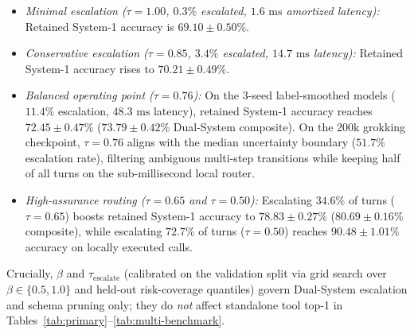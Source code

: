 \documentclass[10pt,twocolumn,letterpaper]{article}
\begin{document}
\begin{enumerate}[leftmargin=1.5em, itemsep=0.1em]
  \begin{itemize}[leftmargin=1.2em, itemsep=0.05em]
    \item \emph{Minimal escalation ($\tau = 1.00$, $0.3\%$ escalated, $1.6\text{ ms}$ amortized latency):} Retained System-1 accuracy is $69.10 \pm 0.50\%$.
    \item \emph{Conservative escalation ($\tau = 0.85$, $3.4\%$ escalated, $14.7\text{ ms}$ latency):} Retained System-1 accuracy rises to $70.21 \pm 0.49\%$.
    \item \emph{Balanced operating point ($\tau = 0.76$):} On the 3-seed label-smoothed models ($11.4\%$ escalation, $48.3\text{ ms}$ latency), retained System-1 accuracy reaches $72.45 \pm 0.47\%$ ($73.79 \pm 0.42\%$ Dual-System composite). On the 200k grokking checkpoint, $\tau = 0.76$ aligns with the median uncertainty boundary ($51.7\%$ escalation rate), filtering ambiguous multi-step transitions while keeping half of all turns on the sub-millisecond local router.
    \item \emph{High-assurance routing ($\tau = 0.65$ and $\tau = 0.50$):} Escalating $34.6\%$ of turns ($\tau=0.65$) boosts retained System-1 accuracy to $78.83 \pm 0.27\%$ ($80.69 \pm 0.16\%$ composite), while escalating $72.7\%$ of turns ($\tau=0.50$) reaches $\mathbf{90.48 \pm 1.01\%}$ accuracy on locally executed calls.
  \end{itemize}
  Crucially, $\beta$ and $\tau_{\text{escalate}}$ (calibrated on the validation split via grid search over $\beta \in \{0.5, 1.0\}$ and held-out risk-coverage quantiles) govern Dual-System escalation and schema pruning only; they do \emph{not} affect standalone tool top-1 in Tables~\ref{tab:primary}--\ref{tab:multi-benchmark}.
\end{enumerate}
\end{document}
